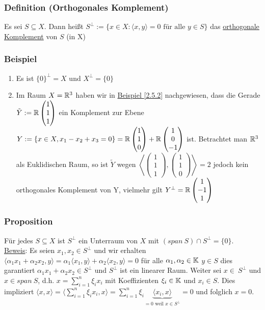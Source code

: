 \subsubsection{Definition (Orthogonales Komplement)}
Es sei $S \subseteq X$. Dann heißt $S^\bot:=\{x\in X\colon\langle x,y \rangle =0\text{ für alle }y\in S\}$
 das \underline{orthogonale Komplement} von $S$ (in X)
\subsubsection{Beispiel}
\numbers
\begin{enumerate}
\item Es ist $\{0\}^\bot=X$ und $X^{\bot}=\{0\}$
\item Im Raum $X=\mathbb{R}^3$ haben wir in \hyperref[2.5.2]{Beispiel \ref*{2.5.2}} nachgewiesen, dass die Gerade $\tilde{Y}:=\mathbb{R}\begin{pmatrix}1 \\1 \\1\end{pmatrix}$ ein Komplement zur Ebene $Y:=\{x\in X, x_1-x_2+x_3=0\}=\mathbb{R}\begin{pmatrix}1\\1\\0\end{pmatrix}+\mathbb{R}\begin{pmatrix}1\\0\\-1\end{pmatrix}$ ist.
Betrachtet man $\mathbb{R}^3$ als Euklidischen Raum, so ist $\tilde{Y}$ wegen $\left\langle \begin{pmatrix}1 \\1 \\1\end{pmatrix},\begin{pmatrix}1 \\1 \\0\end{pmatrix}\right\rangle=2$ jedoch kein orthogonales Komplement von Y, vielmehr gilt $Y^{\bot}=\mathbb{R}\begin{pmatrix}1 \\-1 \\1\end{pmatrix}$
\end{enumerate}
\subsubsection{Proposition}
\label{5.1.9}
Für jedes $S\subseteq X$ ist $S^{\bot}$ ein Unterraum von $X$ mit $(span\ S)\cap S^{\bot}=\{0\}$.\\
\underline{Beweis}: Es seien $x_1,x_2\in S^{\bot}$ und wir erhalten $\langle \alpha_1 x_1+\alpha_2 x_2,y\rangle=\alpha_1\langle x_1,y\rangle+\alpha_2\langle x_2,y\rangle=0$ für alle $\alpha_1,\alpha_2\in\mathbb{K}$ $y\in S$ dies garantiert $\alpha_1 x_1+\alpha_2 x_2\in S^{\bot}$ und $S^{\bot}$ ist ein linearer Raum.
Weiter sei $x\in\ S^{\bot}$ und $x\in span~S$, d.h. $x=\sum_{i=1}^n \xi_i x_i$ mit Koeffizienten $\xi_i\in \mathbb{K}$ und $x_i\in S$. Dies impliziert $\langle x,x\rangle=\langle \sum_{i=1}^n \xi_i x_i,x\rangle=\sum_{i=1}^n\xi_i \underbrace{\langle x_i,x\rangle}_{=0\text{ weil }x\in S^{\bot}}=0$ und folglich $x=0$.
